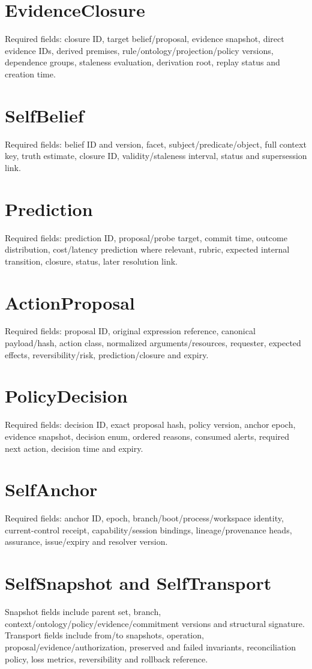 \documentclass[11pt,oneside]{report}
\begin{document}
\section{EvidenceClosure}
Required fields: closure ID, target belief/proposal, evidence snapshot, direct evidence IDs, derived premises, rule/ontology/projection/policy versions, dependence groups, staleness evaluation, derivation root, replay status and creation time.

\section{SelfBelief}
Required fields: belief ID and version, facet, subject/predicate/object, full context key, truth estimate, closure ID, validity/staleness interval, status and supersession link.

\section{Prediction}
Required fields: prediction ID, proposal/probe target, commit time, outcome distribution, cost/latency prediction where relevant, rubric, expected internal transition, closure, status, later resolution link.

\section{ActionProposal}
Required fields: proposal ID, original expression reference, canonical payload/hash, action class, normalized arguments/resources, requester, expected effects, reversibility/risk, prediction/closure and expiry.

\section{PolicyDecision}
Required fields: decision ID, exact proposal hash, policy version, anchor epoch, evidence snapshot, decision enum, ordered reasons, consumed alerts, required next action, decision time and expiry.

\section{SelfAnchor}
Required fields: anchor ID, epoch, branch/boot/process/workspace identity, current-control receipt, capability/session bindings, lineage/provenance heads, assurance, issue/expiry and resolver version.

\section{SelfSnapshot and SelfTransport}
Snapshot fields include parent set, branch, context/ontology/policy/evidence/commitment versions and structural signature. Transport fields include from/to snapshots, operation, proposal/evidence/authorization, preserved and failed invariants, reconciliation policy, loss metrics, reversibility and rollback reference.
\end{document}
